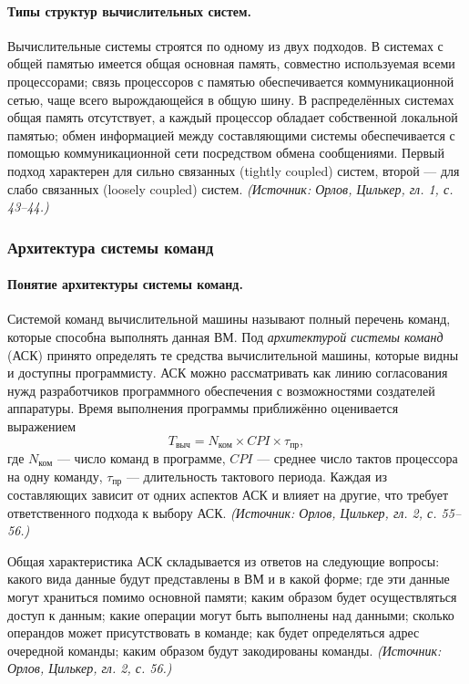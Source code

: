 \documentclass[a4paper,12pt]{article}
\begin{document}
\paragraph{Типы структур вычислительных систем.}
Вычислительные системы строятся по одному из двух подходов. В системах с общей памятью имеется общая основная память, совместно используемая всеми процессорами; связь процессоров с памятью обеспечивается коммуникационной сетью, чаще всего вырождающейся в общую шину. В распределённых системах общая память отсутствует, а каждый процессор обладает собственной локальной памятью; обмен информацией между составляющими системы обеспечивается с помощью коммуникационной сети посредством обмена сообщениями. Первый подход характерен для сильно связанных (tightly coupled) систем, второй --- для слабо связанных (loosely coupled) систем.
\textit{(Источник: Орлов, Цилькер, гл. 1, с. 43--44.)}

\subsubsection{Архитектура системы команд}

\paragraph{Понятие архитектуры системы команд.}
Системой команд вычислительной машины называют полный перечень команд, которые способна выполнять данная ВМ. Под \emph{архитектурой системы команд} (АСК) принято определять те средства вычислительной машины, которые видны и доступны программисту. АСК можно рассматривать как линию согласования нужд разработчиков программного обеспечения с возможностями создателей аппаратуры. Время выполнения программы приближённо оценивается выражением
\[
T_{\text{выч}}=N_{\text{ком}}\times CPI\times \tau_{\text{пр}},
\]
где \(N_{\text{ком}}\) --- число команд в программе, \(CPI\) --- среднее число тактов процессора на одну команду, \(\tau_{\text{пр}}\) --- длительность тактового периода. Каждая из составляющих зависит от одних аспектов АСК и влияет на другие, что требует ответственного подхода к выбору АСК.
\textit{(Источник: Орлов, Цилькер, гл. 2, с. 55--56.)}

Общая характеристика АСК складывается из ответов на следующие вопросы: какого вида данные будут представлены в ВМ и в какой форме; где эти данные могут храниться помимо основной памяти; каким образом будет осуществляться доступ к данным; какие операции могут быть выполнены над данными; сколько операндов может присутствовать в команде; как будет определяться адрес очередной команды; каким образом будут закодированы команды.
\textit{(Источник: Орлов, Цилькер, гл. 2, с. 56.)}
\end{document}
